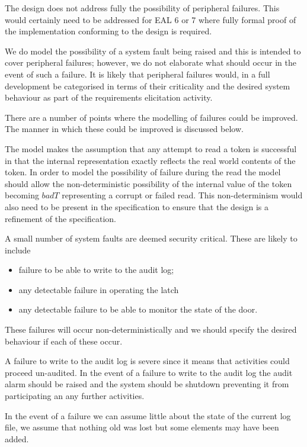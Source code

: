 The design does not address fully the possibility of peripheral
failures. This would certainly need to be addressed for EAL 6 or 7
where fully formal proof of the implementation conforming to the
design is required. 

We do model the possibility of a system fault being raised and this is
intended to cover peripheral failures; however, we do not elaborate what
should occur in the event of such a failure. It is likely that
peripheral failures would, in a full development be categorised in
terms of their criticality and the desired system behaviour as part of
the requirements elicitation activity. 

There are a number of points where the modelling of failures could be
improved. The manner in which these could be improved is discussed
below. 

The model makes the assumption that any attempt to read a token is
successful in that the internal representation exactly reflects the
real world contents of the token. In order to model the possibility of
failure during the read the model should allow the non-deterministic
possibility of the internal value of the token becoming $badT$
representing a corrupt or failed read. This non-determinism would also
need to be present in the specification to ensure that the design is a
refinement of the specification. 

A small number of system faults are deemed security
critical. These are likely to include  
\begin{itemize}
\item
failure to be able to write to the audit log; 
\item
any detectable failure in operating the latch
\item
any detectable failure to be able to monitor the state of the door.
\end{itemize}
These failures will occur non-deterministically and we should specify
the desired behaviour if each of these occur. 

A failure to write to the audit log is severe since it means that
activities could proceed un-audited.  
In the event of a failure to write to the audit log the audit alarm
should be raised and the system should be shutdown preventing it from
participating an any further activities. 

In the event of a failure we can assume little about the state of the
current log file, we assume that nothing old was lost but some
elements may have been added.

